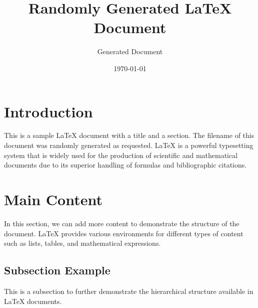 \documentclass{article}
\title{Randomly Generated LaTeX Document}
\author{Generated Document}
\date{\today}
\begin{document}
\maketitle

\section{Introduction}
This is a sample LaTeX document with a title and a section. The filename of this document was randomly generated as requested. LaTeX is a powerful typesetting system that is widely used for the production of scientific and mathematical documents due to its superior handling of formulas and bibliographic citations.

\section{Main Content}
In this section, we can add more content to demonstrate the structure of the document. LaTeX provides various environments for different types of content such as lists, tables, and mathematical expressions.

\subsection{Subsection Example}
This is a subsection to further demonstrate the hierarchical structure available in LaTeX documents.
\end{document}
